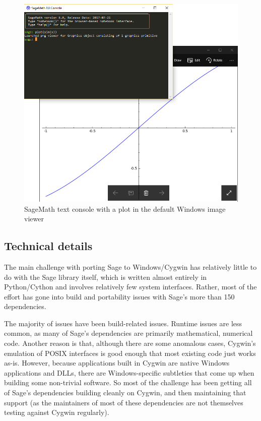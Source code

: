 \begin{figure}[h!]
    \centering
    \includegraphics[width=\textwidth]{screenshots/console}
    \caption{SageMath text console with a plot in the default Windows image viewer}
    \label{fig:console}
\end{figure}

\hypertarget{technical-details}{%
\subsection{Technical details}\label{technical-details}}

The main challenge with porting Sage to Windows/Cygwin has relatively
little to do with the Sage library itself, which is written almost
entirely in Python/Cython and involves relatively few system interfaces.
Rather, most of the effort has gone into build and portability issues
with Sage's more than 150 dependencies.

The majority of issues have been build-related issues. Runtime issues
are less common, as many of Sage's dependencies are primarily
mathematical, numerical code. Another reason is that, although there are
some anomalous cases, Cygwin's emulation of POSIX interfaces is good
enough that most existing code just works as-is. However, because
applications built in Cygwin are native Windows applications and DLLs,
there are Windows-specific subtleties that come up when building some
non-trivial software. So most of the challenge has been getting all of
Sage's dependencies building cleanly on Cygwin, and then maintaining
that support (as the maintainers of most of these dependencies are not
themselves testing against Cygwin regularly).

